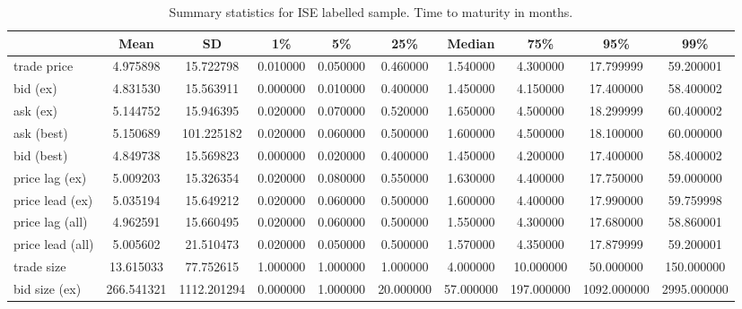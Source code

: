 \begin{table}[ht]
    \centering
    \caption[Summary Statistics for  Sample]{Summary statistics for \gls{ISE} labelled sample. Time to maturity in months.}
    \label{tab:ise-supervised-all}
    \begin{tabular}{@{}lSSSSSSSSS@{}}
        \toprule
        {}               & {Mean}     & {SD}        & {1\%}    & {5\%}    & {25\%}    & {Median}  & {75\%}     & {95\%}      & {99\%}      \\
        \midrule
        trade price      & 4.975898   & 15.722798   & 0.010000 & 0.050000 & 0.460000  & 1.540000  & 4.300000   & 17.799999   & 59.200001   \\
        bid (ex)         & 4.831530   & 15.563911   & 0.000000 & 0.010000 & 0.400000  & 1.450000  & 4.150000   & 17.400000   & 58.400002   \\
        ask (ex)         & 5.144752   & 15.946395   & 0.020000 & 0.070000 & 0.520000  & 1.650000  & 4.500000   & 18.299999   & 60.400002   \\
        ask (best)       & 5.150689   & 101.225182  & 0.020000 & 0.060000 & 0.500000  & 1.600000  & 4.500000   & 18.100000   & 60.000000   \\
        bid (best)       & 4.849738   & 15.569823   & 0.000000 & 0.020000 & 0.400000  & 1.450000  & 4.200000   & 17.400000   & 58.400002   \\
        price lag (ex)   & 5.009203   & 15.326354   & 0.020000 & 0.080000 & 0.550000  & 1.630000  & 4.400000   & 17.750000   & 59.000000   \\
        price lead (ex)  & 5.035194   & 15.649212   & 0.020000 & 0.060000 & 0.500000  & 1.600000  & 4.400000   & 17.990000   & 59.759998   \\
        price lag (all)  & 4.962591   & 15.660495   & 0.020000 & 0.060000 & 0.500000  & 1.550000  & 4.300000   & 17.680000   & 58.860001   \\
        price lead (all) & 5.005602   & 21.510473   & 0.020000 & 0.050000 & 0.500000  & 1.570000  & 4.350000   & 17.879999   & 59.200001   \\\addlinespace
        trade size       & 13.615033  & 77.752615   & 1.000000 & 1.000000 & 1.000000  & 4.000000  & 10.000000  & 50.000000   & 150.000000  \\
        bid size (ex)    & 266.541321 & 1112.201294 & 0.000000 & 1.000000 & 20.000000 & 57.000000 & 197.000000 & 1092.000000 & 2995.000000 \\

\end{tabular}
\end{table}
